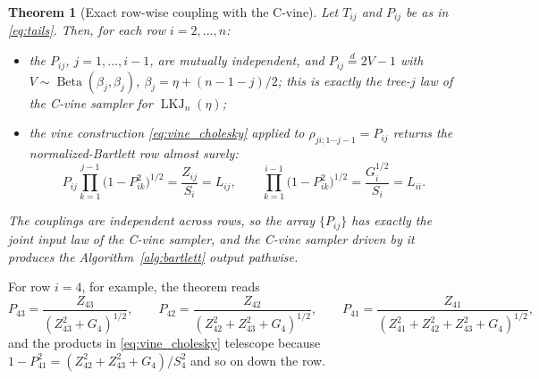 \documentclass[12pt,english]{article}
\theoremstyle{plain} %
\newtheorem{theorem}{Theorem}
\theoremstyle{definition} %
\theoremstyle{remark} %
\begin{document}
\begin{theorem}[Exact row-wise coupling with the C-vine]
\label{thm:vine_coupling}
Let $T_{ij}$ and $P_{ij}$ be as in \eqref{eq:tails}. Then, for each row $i=2,\ldots,n$:
\begin{itemize}
\item[(i)] the $P_{ij}$, $j=1,\ldots,i-1$, are mutually independent, and $P_{ij}\overset{d}{=}2V-1$ with $V\sim\operatorname{Beta}(\beta_j,\beta_j)$, $\beta_j=\eta+(n-1-j)/2$; this is exactly the tree-$j$ law of the C-vine sampler for $\operatorname{LKJ}_n(\eta)$;
\item[(ii)] the vine construction \eqref{eq:vine_cholesky} applied to $\rho_{ji;1\cdots j-1}=P_{ij}$ returns the normalized-Bartlett row \emph{almost surely}:
$$
P_{ij}\prod_{k=1}^{j-1}\bigl(1-P_{ik}^2\bigr)^{1/2}=\frac{Z_{ij}}{S_i}=L_{ij},
\qquad
\prod_{k=1}^{i-1}\bigl(1-P_{ik}^2\bigr)^{1/2}=\frac{G_i^{1/2}}{S_i}=L_{ii}.
$$
\end{itemize}
The couplings are independent across rows, so the array $\{P_{ij}\}$ has exactly the joint input law of the C-vine sampler, and the C-vine sampler driven by it produces the Algorithm~\ref{alg:bartlett} output pathwise.
\end{theorem}

For row $i=4$, for example, the theorem reads
$$
P_{43}=\frac{Z_{43}}{(Z_{43}^2+G_4)^{1/2}},
\qquad
P_{42}=\frac{Z_{42}}{(Z_{42}^2+Z_{43}^2+G_4)^{1/2}},
\qquad
P_{41}=\frac{Z_{41}}{(Z_{41}^2+Z_{42}^2+Z_{43}^2+G_4)^{1/2}},
$$
and the products in \eqref{eq:vine_cholesky} telescope because $1-P_{41}^2=(Z_{42}^2+Z_{43}^2+G_4)/S_4^2$ and so on down the row.
\end{document}
